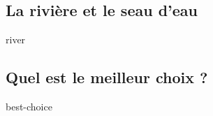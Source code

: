 \subsection{La rivière et le seau d'eau}

{river}



\subsection{Quel est le meilleur choix ?}

{best-choice}
